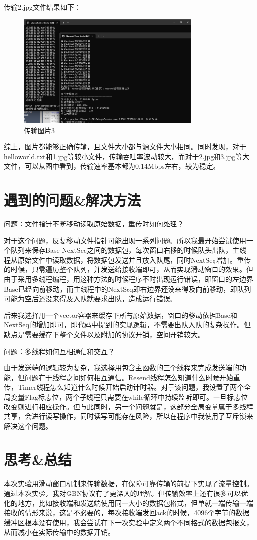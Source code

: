 \documentclass[UTF8,a4paper,10pt]{ctexart}
\begin{document}
传输2.jpg文件结果如下：
\begin{figure}[H]
    \centering
\includegraphics[width=0.8\textwidth]{img/传输图片3.png}
    \caption{传输图片3}
\end{figure}
综上，图片都能够正确传输，且文件大小都与源文件大小相同。同时发现，对于helloworld.txt和1.jpg等较小文件，传输吞吐率波动较大，而对于2.jpg和3.jpg等大文件，可以从图中看到，传输速率基本都为0.14Mbps左右，较为稳定。

\section{遇到的问题\&解决方法}

问题：文件指针不断移动读取原始数据，重传时如何处理？\par
对于这个问题，反复移动文件指针可能出现一系列问题。所以我最开始尝试使用一个队列来保存Base-NextSeq之间的数据包，每次窗口右移的时候队头出队，主线程从原始文件中读取数据，将数据包发送并且放入队尾，同时NextSeq增加。重传的时候，只需遍历整个队列，并发送给接收端即可，从而实现滑动窗口的效果。但由于采用多线程编程，用这种方法的时候程序不时出现运行错误，即窗口的左边界Base已经向前移动，而主线程中的NextSeq即右边界还没来得及向前移动，即队列可能为空后还没来得及入队就要求出队，造成运行错误。\par
后来我选择用一个vector容器来缓存下所有原始数据，窗口的移动依据Base和NextSeq的增加即可，即代码中提到的实现逻辑，不需要出队入队的复杂操作。但缺点是需要缓存下整个文件以及附加的协议开销，空间开销较大。\par

\vspace{1cm}
问题：多线程如何互相通信和交互？\par
由于发送端的逻辑较为复杂，我选择用包含主函数的三个线程来完成发送端的功能，但问题在于线程之间如何相互通信。Resend线程怎么知道什么时候开始重传，Timer线程怎么知道什么时候开始启动计时器。对于该问题，我设置了两个全局变量Flag标志位，两个子线程只需要在while循环中持续监听即可。一旦标志位改变则进行相应操作。但与此同时，另一个问题就是，这部分全局变量属于多线程共享，会进行读写操作，同时读写可能存在风险，所以在程序中我使用了互斥锁来解决这个问题。

\section{思考\&总结}
本次实验用滑动窗口机制来传输数据，在保障可靠传输的前提下实现了流量控制。通过本次实验，我对GBN协议有了更深入的理解。但传输效率上还有很多可以优化的地方，比如接收端和发送端使用同一大小的数据包格式，但单就一端传输一端接收的情形来说，这是不必要的，每次接收端发回ack的时候，4096个字节的数据缓冲区根本没有使用，我会尝试在下一次实验中定义两个不同格式的数据包报文，从而减小在实际传输中的数据开销。
\end{document}
